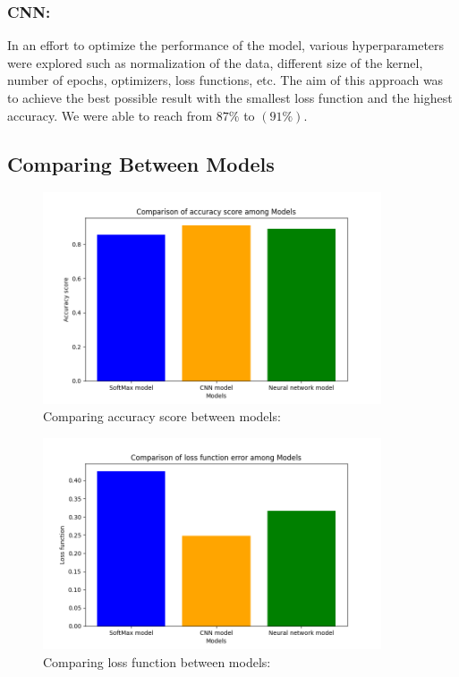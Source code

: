 \documentclass{article}
\begin{document}
\subsubsection{CNN:}
In an effort to optimize the performance of the model, various hyperparameters were explored such as normalization of the data, different size of the kernel, number of epochs, optimizers, loss functions, etc.
The aim of this approach was to achieve the best possible result with the smallest loss function and the highest accuracy. We were able to reach from ${87\%}$ to $(91\%)$.\\

\subsection{Comparing Between Models}
\begin{figure}[H]
    \caption{Comparing accuracy score between models: }
    \centering
    \includegraphics[width=10cm]{imgFolder/accurateFuncComparison.png}
\end{figure}
\begin{figure}[H]
    \caption{Comparing loss function between models:}
    \centering
    \includegraphics[width=10cm]{imgFolder/lossFuncComparison.png}
\end{figure}
\end{document}
